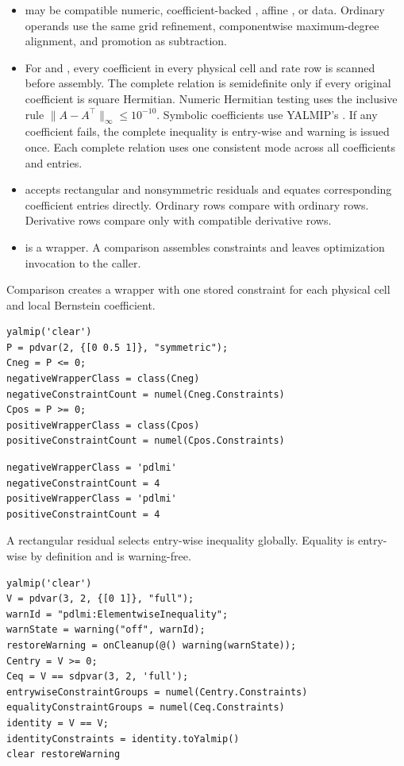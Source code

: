 \arghead
\begin{itemize}[leftmargin=*]
  \item {} may be compatible numeric, coefficient-backed , affine , or  data. Ordinary operands use the same grid refinement, componentwise maximum-degree alignment, and promotion as subtraction. \item For \code{<=} and \code{>=}, every coefficient in every physical cell and rate row is scanned before assembly. The complete relation is semidefinite only if every original coefficient is square Hermitian. Numeric Hermitian testing uses the inclusive rule $\lVert A-A^\top \rVert_\infty\le10^{-10}$. Symbolic coefficients use YALMIP's . If any coefficient fails, the complete inequality is entry-wise and warning  is issued once. Each complete relation uses one consistent mode across all coefficients and entries. \item \code{==} accepts rectangular and nonsymmetric residuals and equates corresponding coefficient entries directly. Ordinary rows compare with ordinary rows. Derivative rows compare only with compatible derivative rows. \item {} is a  wrapper. A comparison assembles constraints and leaves optimization invocation to the caller.
\end{itemize}

\examplehead
Comparison creates a  wrapper with one stored constraint for each physical cell and local Bernstein coefficient.

\begin{lstlisting}[style=dpmatlab]
yalmip('clear')
P = pdvar(2, {[0 0.5 1]}, "symmetric");
Cneg = P <= 0;
negativeWrapperClass = class(Cneg)
negativeConstraintCount = numel(Cneg.Constraints)
Cpos = P >= 0;
positiveWrapperClass = class(Cpos)
positiveConstraintCount = numel(Cpos.Constraints)
\end{lstlisting}

\begin{lstlisting}[style=dpoutput]
negativeWrapperClass = 'pdlmi'
negativeConstraintCount = 4
positiveWrapperClass = 'pdlmi'
positiveConstraintCount = 4
\end{lstlisting}

A rectangular residual selects entry-wise inequality globally.  Equality is entry-wise by definition and is warning-free.

\begin{lstlisting}[style=dpmatlab]
yalmip('clear')
V = pdvar(3, 2, {[0 1]}, "full");
warnId = "pdlmi:ElementwiseInequality";
warnState = warning("off", warnId);
restoreWarning = onCleanup(@() warning(warnState));
Centry = V >= 0;
Ceq = V == sdpvar(3, 2, 'full');
entrywiseConstraintGroups = numel(Centry.Constraints)
equalityConstraintGroups = numel(Ceq.Constraints)
identity = V == V;
identityConstraints = identity.toYalmip()
clear restoreWarning
\end{lstlisting}

